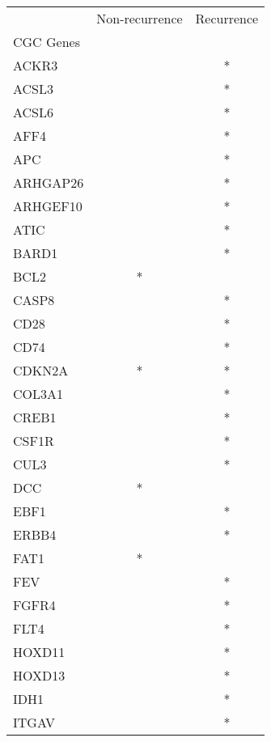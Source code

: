 \begin{tabular}{lcc}
\toprule
{} & Non-recurrence & Recurrence \\
CGC Genes &                &            \\
\midrule
ACKR3     &                &          * \\
ACSL3     &                &          * \\
ACSL6     &                &          * \\
AFF4      &                &          * \\
APC       &                &          * \\
ARHGAP26  &                &          * \\
ARHGEF10  &                &          * \\
ATIC      &                &          * \\
BARD1     &                &          * \\
BCL2      &              * &            \\
CASP8     &                &          * \\
CD28      &                &          * \\
CD74      &                &          * \\
CDKN2A    &              * &          * \\
COL3A1    &                &          * \\
CREB1     &                &          * \\
CSF1R     &                &          * \\
CUL3      &                &          * \\
DCC       &              * &            \\
EBF1      &                &          * \\
ERBB4     &                &          * \\
FAT1      &              * &            \\
FEV       &                &          * \\
FGFR4     &                &          * \\
FLT4      &                &          * \\
HOXD11    &                &          * \\
HOXD13    &                &          * \\
IDH1      &                &          * \\
ITGAV     &                &          * \\

\end{tabular}
